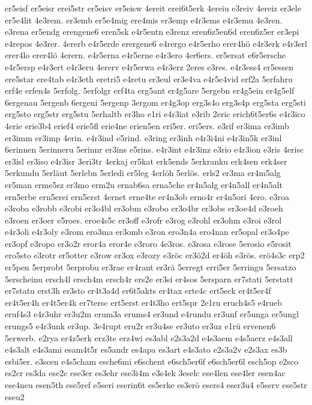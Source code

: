 {er5eisf
er5eisr
erei5str
er5eisv
er5eisw
4ereit
erei6t5erk
4ereiu
e3reiv
4ereiz
er3ele
er5e4lit
4e3rem.
er3emb
er5e4mig
ere4mis
er3emp
e4r3ems
e4r3emu
4e3ren.
e3rena
er5endg
erengene6
eren5sk
e4r5entn
e3renz
eren6z5en6d
eren6z5er
er3epi
e4repos
4e3rer.
4ererb
e4r5erde
erergene6
e4rergo
e4r5erho
erer4hö
e4r3erk
e4r3erl
erer4lo
erer4lö
4erern.
e4r5erna
e4r5erne
e4r3ero
4er6ers.
er5ersat
e6r5ersche
e4r5ersp
e4r3ert
e4r3eru
4ererv
e4r5erwa
e4r3erz
2eres
e3res.
e4r3ess4
er5essen
ere5star
ere4tab
e4r3eth
eretri5
e4retu
er3eul
er3e4va
e4r5e4vid
erf2a
5erfahru
erf4e
erfen4s
5erfolg.
5erfolgr
erf4ta
erg5ant
er4g5are
5ergebn
er4g5ein
er4g5elf
6ergenau
5ergenb
6ergeni
5ergenp
3ergom
er4g3op
erg3s4o
erg3s4p
erg5sta
erg5sti
erg5sto
erg5str
erg5stu
5erhaltb
er3ho
e1ri
e4r3iat
e3rib
2eric
erich6t5er6s
e4r3ico
4erie
erie3b4
erief4
erie5fl
erie4ne
erien5en
eri5er.
eri5ers.
e3rif
er3ima
er3imb
er3imm
er3imp
4erin.
e4r3ind
e5rind.
e3ring
er3inh
e4r3i4ni
e4r3in5k
er3inl
6erinnen
5erinneru
5erinnr
er3ins
e5rins.
e4r3int
e4r3inz
e3rio
e4r3ion
e3ris
4erisc
er3isl
er3iso
e4r3isr
3eri3tr
4erkaj
er5kat
erk5ends
5erkranku
erk4sen
erk4ser
5erkundu
5erläut
5erlebn
5erledi
er5leg
4erlöh
5erlös.
erls2
er3ma
er4m5alg
er5man
erme5sz
er3mo
erm2u
ernab6sa
erna5che
er4n5alg
er4n5all
er4n5alt
ern5erbe
ern5erei
ern5erst
4ernet
erne4te
er4n3ob
erno4r
er4n5ori
4ero.
e3roa
e3roba
e3robb
e3robi
er3o4bl
er3obm
e3robo
er3o4br
er3obs
er3oe4d
e3roeh
e3roen
er3oer
e5roes.
eroe4s5c
er3off
e3rofr
e3rog
e3rohl
er3ohm
e3roi
e3rol
e4r3oli
e4r3oly
e3rom
ero3ma
er3omb
e3ron
ero3n4a
ero4nan
er5opal
er3o4pe
er3opf
e3ropo
er3o2r
eror4a
eror4e
e3roro
4e3ros.
e3rosa
e3rose
5erosio
e5rosit
ero5sto
e3rotr
er5otter
e3row
er3ox
e3rozy
e3röc
er3ö2d
er4öh
e3rös.
erö4s3c
erp2
er5pen
5erprobt
5erprobu
er3rae
er4rant
er3rä
5erregt
erri5er
5erringu
5ersatzo
5erscheinu
ersch4l
ersch4m
ersch4r
ers2e
er3si
er4sos
5ersparn
er7stati
5erstatt
er7statu
erst3h
er3sto
er4t3a4d
er6t5akts
er4tax
erte4c
ert5eck
er4t5er4f
er4t5er4h
er4t5er4k
er7tersc
ert5erst
er4t3ho
ert5spr
2e1ru
eruch4s5
e4rueb
eruf4s3
e4r3uhr
er3u2m
erum3a
erums4
er3und
e4rundu
er3unf
er5unga
er5ungl
erungs5
e4r3unk
er3up.
3e4rupt
eru2r
er3u4se
er3uto
er3uz
e1rü
ervenen6
5erwerb.
e2rya
er4z5erk
erz3te
erz4wi
es3abl
e2s3a2d
e4s3aem
e4s5aerz
e4s3all
e4s3alt
e4s3ami
esam4t5r
es5andr
es4apa
es3art
e4s3ato
e2s3a2v
e2s3ax
es3b
esbi5er.
e3scen
e4s5cham
esche6mi
e6schent
e6sch5er6f
e6sch5er6l
esch5op
e2sco
es2cr
es3da
ese2c
ese3er
es3ehr
ese3i4m
e3s4ek
3eselc
ese4len
ese4ler
esen4ac
ese4neu
esen5th
ese5ref
e5seri
eserin6t
es5erke
es3erö
esers4
eser3u4
e5serv
ese5str
eseu2
}
